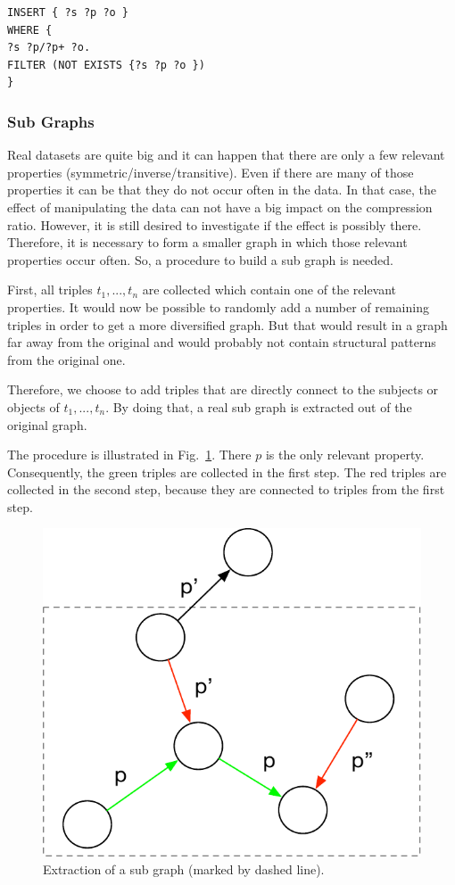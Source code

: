 \begin{lstlisting}[captionpos=b, caption=SPARQL update for adding triples with the transitive property p., label=lst:transitiveInsert,
basicstyle=\ttfamily,frame=single,float=hbt,]
INSERT { ?s ?p ?o }
WHERE { 
?s ?p/?p+ ?o. 
FILTER (NOT EXISTS {?s ?p ?o })
}
\end{lstlisting}

\subsubsection{Sub Graphs}

Real datasets are quite big and it can happen that there are only a few relevant properties (symmetric/inverse/transitive). Even if there are many of those properties it can be that they do not occur often in the data. In that case, the effect of manipulating the data can not have a big impact on the compression ratio. However, it is still desired to investigate if the effect is possibly there. Therefore, it is necessary to form a smaller graph in which those relevant properties occur often. So, a procedure to build a sub graph is needed.

First, all triples $t_1,...,t_n$ are collected which contain one of the relevant properties. It would now be possible to randomly add a number of remaining triples in order to get a more diversified graph. But that would result in a graph far away from the original and would probably not contain structural patterns from the original one.

Therefore, we choose to add triples that are directly connect to the subjects or objects of $t_1,...,t_n$. By doing that, a real sub graph is extracted out of the original graph.

The procedure is illustrated in Fig.~\ref{fig:subgraph}. There $p$ is the only relevant property. Consequently, the green triples are collected in the first step. The red triples are collected in the second step, because they are connected to triples from the first step.

\begin{figure}
	\centering
	\includegraphics[width=0.4\linewidth]{figures/4_implementation/subgraph}
	\caption{Extraction of a sub graph (marked by dashed line).}
	\label{fig:subgraph}
\end{figure}



